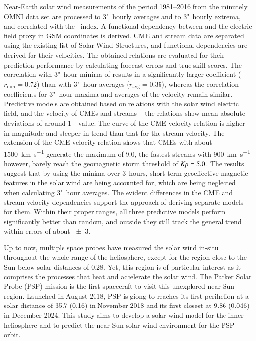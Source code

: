 Near-Earth solar wind measurements of the period 1981--2016 from the minutely OMNI data set are processed to 3"~hourly averages and to 3"~hourly extrema, and correlated with the \Kp~index. A functional dependency between \Kp{} and the electric field proxy \vBz{} in GSM coordinates is derived. CME and stream data are separated using the existing list of Solar Wind Structures, and functional \Kp{} dependencies are derived for their velocities. The obtained relations are evaluated for their prediction performance by calculating forecast errors and true skill scores.
The \Kp{} correlation with 3"~hour minima of \vBz{} results in a significantly larger coefficient ($r_\text{min} = 0.72$) than with 3"~hour averages ($r_\text{avg} = 0.36$), whereas the correlation coefficients for 3"~hour maxima and averages of the velocity remain similar. Predictive \Kp{} models are obtained based on relations with the solar wind electric field, and the velocity of CMEs and streams -- the relations show mean absolute deviations of around 1~\Kp~value. The curve of the CME velocity relation is higher in magnitude and steeper in trend than that for the stream velocity. The extension of the CME velocity relation shows that CMEs with about \SI{1500}{\km\per\s} generate the maximum \Kp{} of \num{9.0}, the fastest streams with \SI{900}{\km\per\s} however, barely reach the geomagnetic storm threshold of $\text{\textit{Kp}} = 5.0$.
The results suggest that by using the \vBz{} minima over 3~hours, short-term geoeffective magnetic features in the solar wind are being accounted for, which are being neglected when calculating 3"~hour averages. The evident differences in the CME and stream velocity dependencies support the approach of deriving separate \Kp{} models for them. Within their proper \Kp{} ranges, all three predictive models perform significantly better than random, and outside they still track the general trend within \Kp{} errors of about \num{+-3}.

\medskip

Up to now, multiple space probes have measured the solar wind in-situ throughout the whole range of the heliosphere, except for the region close to the Sun below solar distances of \SI{0.28}{\au}. Yet, this region is of particular interest as it comprises the processes that heat and accelerate the solar wind. The Parker Solar Probe (PSP) mission is the first spacecraft to visit this unexplored near-Sun region. Launched in August 2018, PSP is giong to reaches its first perihelion at a solar distance of \SI{35.7}{\Rs} (\SI{0.16}{\au}) in November 2018 and its first closest at \SI{9.86}{\Rs} (\SI{0.046}{\au}) in December 2024.
This study aims to develop a solar wind model for the inner heliosphere and to predict the near-Sun solar wind environment for the PSP orbit.

